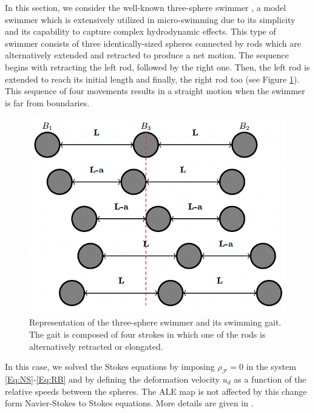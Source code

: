 \documentclass[graybox]{svmult}
\newcommand{\Fluid}{\mathcal{F}} %
\begin{document}
In this section, we consider the well-known three-sphere swimmer \cite{najafi_simple_2004}, a model swimmer which is extensively utilized in micro-swimming due to its simplicity and its capability to capture complex hydrodynamic effects.
This type of swimmer consists of three identically-sized spheres connected by rods which are alternatively extended and retracted to produce a net motion. The sequence begins with retracting the left rod, followed by the right one. Then, the left rod is extended to reach its initial length and finally, the right rod too (see Figure \ref{Fig:3ss1}). 
This sequence of four movements results in a straight motion when the swimmer is far from boundaries. 

\begin{figure}
	\centering
	\includegraphics[scale=0.55]{img-three-sphere-3ss.png}

	\caption{Representation of the three-sphere swimmer and its swimming gait. The gait is composed of four strokes in which one of the rods is alternatively retracted or elongated.}
	\label{Fig:3ss1}
\end{figure}

In this case, we solved the Stokes equations by imposing $\rho_{\Fluid}=0$ in the system \eqref{Eq:NS}-\eqref{Eq:RB} and by defining the deformation velocity $u_d$ as a function of the relative speeds between the spheres. The ALE map is not affected by this change form Navier-Stokes to Stokes equations. More details are given in \cite{berti_modelling_2021}. 
\end{document}
